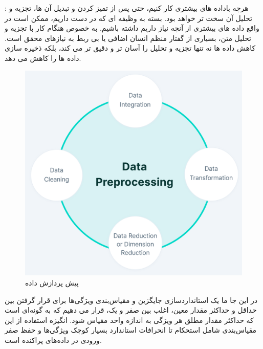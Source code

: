\documentclass{article}
\begin{document}
  
   : هرچه باداده های بیشتری کار کنیم، حتی پس از تمیز کردن و تبدیل آن ها، تجزیه و تحلیل آن سخت تر خواهد بود. بسته به وظیفه ای که در دست داریم، ممکن است در واقع داده های بیشتری از آنچه نیاز داریم داشته باشیم. به خصوص هنگام کار با تجزیه و تحلیل متن، بسیاری از گفتار منظم انسان اضافی یا بی ربط به نیازهای محقق است. کاهش داده ها نه تنها تجزیه و تحلیل را آسان تر و دقیق تر می کند، بلکه ذخیره سازی داده ها را کاهش می دهد.\newline
 \newpage
 \begin{figure}[h]
 	\centering
 	\includegraphics[width=0.5\linewidth]{Photo/13}
 	\caption[پیش پردازش داده]{پیش پردازش داده}
 	\label{fig:13}
 \end{figure}
در این جا ما یک استانداردسازی جایگزین و مقیاس‌بندی ویژگی‌ها برای قرار گرفتن بین حداقل و حداکثر مقدار معین، اغلب بین صفر و یک، قرار می دهیم که به گونه‌ای است که حداکثر مقدار مطلق هر ویژگی به اندازه واحد مقیاس شود.
\newline
انگیزه استفاده از این مقیاس‌بندی شامل استحکام تا انحرافات استاندارد بسیار کوچک ویژگی‌ها و حفظ صفر ورودی در داده‌های پراکنده است.
\end{document}
